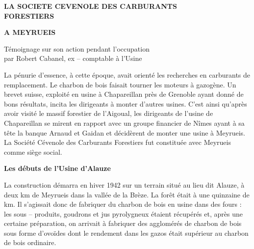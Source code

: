
\begin{center}
    {\Large\bfseries
    LA SOCIETE CEVENOLE DES CARBURANTS\\
    FORESTIERS
    }

    \vspace{0.7cm}

    {\Large\bfseries
    A MEYRUEIS
    }

    \vspace{0.9cm}

    Témoignage sur son action pendant l’occupation\\
    par Robert Cabanel, ex – comptable à l’Usine
\end{center}

\vspace{1.1cm}

La pénurie d’essence, à cette époque, avait orienté les recherches en carburants de
remplacement. Le charbon de bois faisait tourner les moteurs à gazogène. Un brevet suisse,
exploité en usine à Chapareillan près de Grenoble ayant donné de bons résultats, incita les
dirigeants à monter d’autres usines. C’est ainsi qu’après avoir visité le massif forestier de
l’Aigoual, les dirigeants de l’usine de Chapareillan se mirent en rapport avec un groupe
financier de Nîmes ayant à sa tête la banque Arnaud et Gaidan et décidèrent de monter une
usine à Meyrueis. La Société Cévenole des Carburants Forestiers fut constituée avec Meyrueis
comme siège social.

\vspace{0.45cm}

\textbf{Les débuts de l’Usine d’Alauze}

\vspace{0.35cm}

La construction démarra en hiver 1942 sur un terrain situé au lieu dit Alauze, à deux km de
Meyrueis dans la vallée de la Brèze. La forêt était à une quinzaine de km. Il s’agissait donc de
fabriquer du charbon de bois en usine dans des fours : les sous – produits, goudrons et jus
pyrolygneux étaient récupérés et, après une certaine préparation, on arrivait à fabriquer des
agglomérés de charbon de bois sous forme d’ovoïdes dont le rendement dans les gazos était
supérieur au charbon de bois ordinaire.

\vspace{0.45cm}

